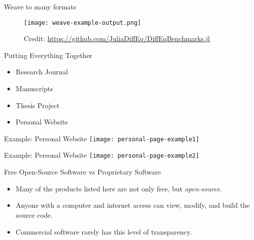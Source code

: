 \documentclass{beamer}
\begin{document}
\begin{frame}{Weave to many formats}
  \begin{figure}[]
    \centering
    \texttt{[image: weave-example-output.png]}
    \caption{
      Credit: \url{https://github.com/JuliaDiffEq/DiffEqBenchmarks.jl}
    }
  \end{figure}
\end{frame}

\begin{frame}{Putting Everything Together}
  \begin{itemize}
    \item Research Journal

    \item Manuscripts

    \item Thesis Project

    \item Personal Website
  \end{itemize}
\end{frame}

\begin{frame}{Example: Personal Website}
  \center
  \texttt{[image: personal-page-example1]}
\end{frame}

\begin{frame}{Example: Personal Website}
  \center
  \texttt{[image: personal-page-example2]}
\end{frame}

\begin{frame}{Free Open-Source Software vs Proprietary Software}
  \begin{itemize}
    \item Many of the products listed here are not only free, but \textit{open-source}.

    \item Anyone with a computer and internet access can view, modify, and build the source code.

    \item Commercial software rarely has this level of transparency.
  \end{itemize}
\end{frame}



%
%
%
%
\end{document}
